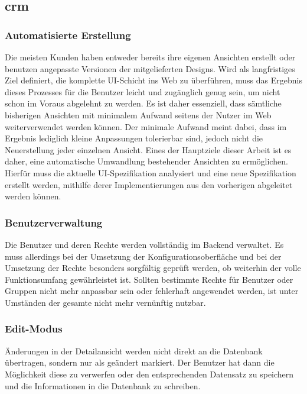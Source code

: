 \subsection{\acrlong{crm}}
\subsubsection{Automatisierte Erstellung}
Die meisten Kunden haben entweder bereits ihre eigenen Ansichten erstellt oder benutzen angepasste Versionen der mitgelieferten Designs. Wird als langfristiges Ziel definiert, die komplette UI-Schicht ins Web zu überführen, muss das Ergebnis dieses Prozesses für die Benutzer leicht und zugänglich genug sein, um nicht schon im Voraus abgelehnt zu werden. Es ist daher essenziell, dass sämtliche bisherigen Ansichten mit minimalem Aufwand seitens der Nutzer im Web weiterverwendet werden können. Der minimale Aufwand meint dabei, dass im Ergebnis lediglich kleine Anpassungen tolerierbar sind, jedoch nicht die Neuerstellung jeder einzelnen Ansicht. Eines der Hauptziele dieser Arbeit ist es daher, eine automatische Umwandlung bestehender Ansichten zu ermöglichen. Hierfür muss die aktuelle UI-Spezifikation analysiert und eine neue Spezifikation erstellt werden, mithilfe derer Implementierungen aus den vorherigen abgeleitet werden können.

\subsubsection{Benutzerverwaltung}
Die Benutzer und deren Rechte werden vollständig im Backend verwaltet. Es muss allerdings bei der Umsetzung der Konfigurationsoberfläche und bei der Umsetzung der Rechte besonders sorgfältig geprüft werden, ob weiterhin der volle Funktionsumfang gewährleistet ist. Sollten bestimmte Rechte für Benutzer oder Gruppen nicht mehr anpassbar sein  oder fehlerhaft angewendet werden, ist unter Umständen der gesamte  nicht mehr vernünftig nutzbar.

\subsubsection{Edit-Modus}
Änderungen in der Detailansicht werden nicht direkt an die Datenbank übertragen, sondern nur als geändert markiert. Der Benutzer hat dann die Möglichkeit diese zu verwerfen oder den entsprechenden Datensatz zu speichern und die Informationen in die Datenbank zu schreiben.

